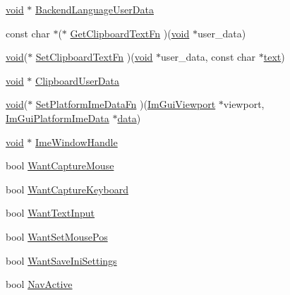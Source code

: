 \begin{DoxyCompactItemize}
\item 
\hyperlink{imgui__impl__opengl3__loader_8h_ac668e7cffd9e2e9cfee428b9b2f34fa7}{void} $\ast$ \hyperlink{structImGuiIO_ad5dc2e55e630b44208ef07bbbef161ea}{Backend\+Language\+User\+Data}
\item 
const char $\ast$($\ast$ \hyperlink{structImGuiIO_ab7face2b2efef720a22a7fb2143d415c}{Get\+Clipboard\+Text\+Fn} )(\hyperlink{imgui__impl__opengl3__loader_8h_ac668e7cffd9e2e9cfee428b9b2f34fa7}{void} $\ast$user\+\_\+data)
\item 
\hyperlink{imgui__impl__opengl3__loader_8h_ac668e7cffd9e2e9cfee428b9b2f34fa7}{void}($\ast$ \hyperlink{structImGuiIO_a1ee9c0763df33f7f3a9819235ce85078}{Set\+Clipboard\+Text\+Fn} )(\hyperlink{imgui__impl__opengl3__loader_8h_ac668e7cffd9e2e9cfee428b9b2f34fa7}{void} $\ast$user\+\_\+data, const char $\ast$\hyperlink{game__play__state_8cpp_a295b62c787445f811e691da4b10f6be4}{text})
\item 
\hyperlink{imgui__impl__opengl3__loader_8h_ac668e7cffd9e2e9cfee428b9b2f34fa7}{void} $\ast$ \hyperlink{structImGuiIO_a162d9da988e8985df05d262640f2f91c}{Clipboard\+User\+Data}
\item 
\hyperlink{imgui__impl__opengl3__loader_8h_ac668e7cffd9e2e9cfee428b9b2f34fa7}{void}($\ast$ \hyperlink{structImGuiIO_a000283dfba912e6af1b607ea19677fd2}{Set\+Platform\+Ime\+Data\+Fn} )(\hyperlink{structImGuiViewport}{Im\+Gui\+Viewport} $\ast$viewport, \hyperlink{structImGuiPlatformImeData}{Im\+Gui\+Platform\+Ime\+Data} $\ast$\hyperlink{imgui__impl__opengl3__loader_8h_abd87654504355b4c1bb002dcb1d4d16a}{data})
\item 
\hyperlink{imgui__impl__opengl3__loader_8h_ac668e7cffd9e2e9cfee428b9b2f34fa7}{void} $\ast$ \hyperlink{structImGuiIO_a8baa252c4f76764eb866b920f227cfa2}{Ime\+Window\+Handle}
\item 
bool \hyperlink{structImGuiIO_af5b8add76c5d833a65df19b5456acd7e}{Want\+Capture\+Mouse}
\item 
bool \hyperlink{structImGuiIO_a458e4ca98d896adb16e3a41ec6d2b811}{Want\+Capture\+Keyboard}
\item 
bool \hyperlink{structImGuiIO_a0e53197e96187a57b2d86720bf163f4d}{Want\+Text\+Input}
\item 
bool \hyperlink{structImGuiIO_a877f6adba2c961f361df7697f908649a}{Want\+Set\+Mouse\+Pos}
\item 
bool \hyperlink{structImGuiIO_a68d3fb726b3f243fa974107fae291d8e}{Want\+Save\+Ini\+Settings}
\item 
bool \hyperlink{structImGuiIO_aa63cf74a15e9dd0ad469ff09ca840ddf}{Nav\+Active}

\end{DoxyCompactItemize}
